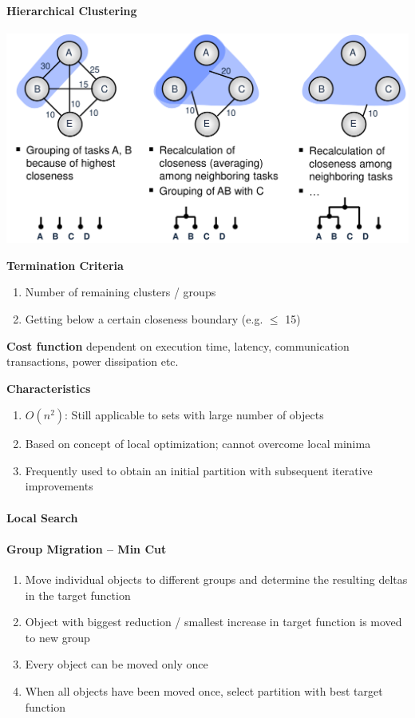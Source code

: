 \documentclass[english]{latex4ei/latex4ei_sheet}
\begin{document}
\paragraph{Hierarchical Clustering}

\begin{center}
  \centering
  \includegraphics[width=0.8\linewidth]{assets/HierarchicalClustering.png}
  \label{fig:hierarchicalclustering}
\end{center}

\textbf{Termination Criteria}
\begin{enumerate}
	\item Number of remaining clusters / groups
	\item Getting below a certain closeness boundary (e.g. $\leq$ 15)
\end{enumerate}

\textbf{Cost function} dependent on execution time, latency, communication transactions, power dissipation etc.

\textbf{Characteristics}
\begin{enumerate}
	\item $O(n^2)$: Still applicable to sets with large number of objects
	\item Based on concept of local optimization; cannot overcome local minima
	\item Frequently used to obtain an initial partition with subsequent iterative improvements
\end{enumerate}

\paragraph{Local Search}
\paragraph{Group Migration – Min Cut}
\begin{enumerate}
  \item Move individual objects to different groups and determine the resulting deltas in the target function
  \item Object with biggest reduction / smallest increase in target function is moved to new group
  \item Every object can be moved only once
  \item When all objects have been moved once, select partition with best target function
\end{enumerate}
\end{document}
